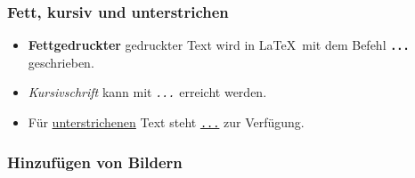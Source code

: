 \begin{frame}[fragile]
\frametitle<presentation>{Fett, kursiv und unterstrichen}

    \begin{itemize}
        \item \textbf{Fettgedruckter} gedruckter Text wird in \LaTeX\ mit dem Befehl
            \texttt{\textbf{...}} geschrieben.
        \item \textit{Kursivschrift} kann mit \texttt{\textit{...}}
            erreicht werden.
        \item Für \underline{unterstrichenen} Text steht
            \texttt{\underline{...}} zur Verfügung.
    \end{itemize}

\end{frame}


\begin{frame}[fragile]
    \frametitle<presentation>{Hinzufügen von Bildern}
    \inputminted[frame=single]{latex}{examples/images.tex}
\end{frame}

